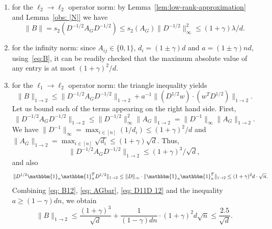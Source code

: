 \documentclass[reqno,a4paper]{amsart}
\theoremstyle{definition}
\begin{document}
\begin{enumerate}[label={(\alph*)},ref=\alph*]
    \item\label{item:1} for the $\ell_2\to \ell_2$ operator norm: by Lemma~\ref{lem:low-rank-approximation} and Lemma~\ref{obs: |N|} we have
    \[\|B\|=s_2(D^{-1/2}A_GD^{-1/2})\le s_2(A_G)\|D^{-1/2}\|^2_{\infty} \le (1+\gamma)\lambda /d.\]
    \item for the infinity norm: since $A_{ij} \in \{0, 1\}$, $d_i = (1\pm \gamma)d$ and $a = (1\pm \gamma) nd$, using~\eqref{eq:B}, it can be readily checked that the maximum absolute value of any entry is at most $(1+\gamma)^2/d$.
    \item for the $\ell_1 \to \ell_2$ operator norm: the triangle inequality yields
    \begin{equation}    \label{eq: B12}
        \|B\|_{1\rightarrow 2} 
        \le \|{D^{-1/2}A_GD^{-1/2}}\|_{1\rightarrow 2} + a^{-1} \|(D^{1/2}w)\cdot (w^T D^{1/2})\|_{1\rightarrow 2}.        
    \end{equation}
    Let us bound each of the terms appearing on the right hand side. First, 
    \[
    \|{D^{-1/2}A_GD^{-1/2}}\|_{1\rightarrow 2}
    \le \|{D^{-1/2}}\|^2_{\infty} \|{A_G}\|_{1\rightarrow 2} = \|{D^{-1}}\|_{\infty} \|{A_G}\|_{1\rightarrow 2}.
    \]
    We have $\|{D^{-1}}\|_{\infty} = \max_{i\in [n]} (1/d_i) \le (1+\gamma)^2/d$ 
    and $\|{A_G}\|_{1\rightarrow 2} = \max_{i\in [n]} \sqrt{d_i} \le (1+\gamma)\sqrt{d}$. Thus, 
    \begin{equation}    \label{eq: AGbar}
        \|{D^{-1/2}A_GD^{-1/2}}\|_{1\rightarrow 2} \le (1+\gamma)^3/\sqrt{d},   
    \end{equation}
    and also
    \begin{equation}    \label{eq: D11D 12}
        \|{D^{1/2} \mathbbm{1}_n \mathbbm{1}_n^T D^{1/2}}\|_{1\rightarrow 2}
        \le \|{D}\|_{\infty} \cdot \|{\mathbbm{1}_n \mathbbm{1}_n^T}\|_{1\rightarrow 2}
        \le (1+\gamma)^2d \cdot \sqrt{n}.   
    \end{equation}
    Combining \eqref{eq: B12}, \eqref{eq: AGbar}, \eqref{eq: D11D 12} and the inequality $a \ge (1-\gamma)dn$, we obtain
    \begin{equation}    \label{eq: B12 bounded}
        \|B\|_{1\rightarrow 2} 
        \le \frac{(1+\gamma)^3}{\sqrt{d}} + \frac{1}{(1-\gamma)dn} \cdot (1+\gamma)^2d\sqrt{n}
        \le \frac{2.5}{\sqrt{d}}.
    \end{equation}
\end{enumerate}
\end{document}
